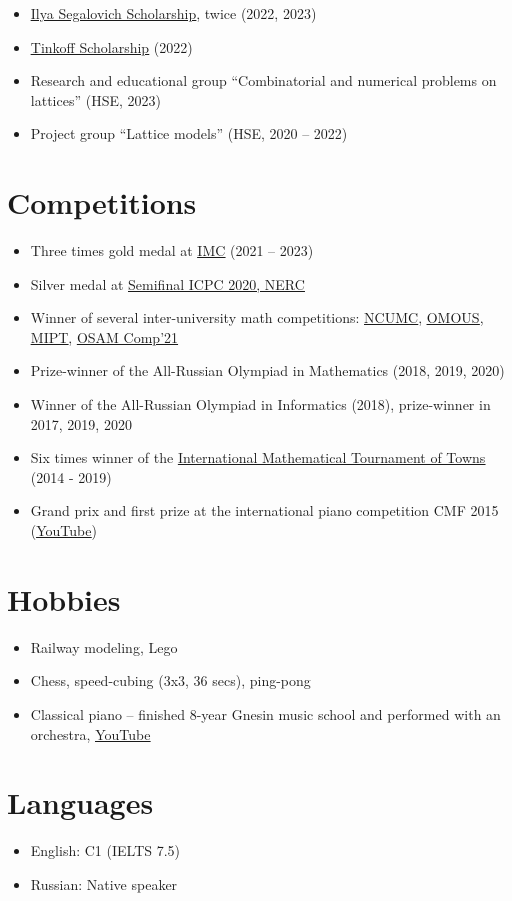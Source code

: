 \documentclass[letterpaper,11pt]{article}
\newcommand{\resumeBulletListStart}{\begin{itemize}[leftmargin=0.3in]}
\newcommand{\resumeBulletListEnd}{\end{itemize}\vspace{-8pt}}
\newcommand{\resumeItem}[1]{\item\small{{#1 \vspace{-2pt}}}}
\newcommand{\resumeSubItem}[1]{\resumeItem{#1}\vspace{-4pt}}
\begin{document}
\resumeBulletListStart
\resumeSubItem{\href{https://cs.hse.ru/en/stipend}{\underline{Ilya Segalovich Scholarship}}, twice (2022, 2023)}
\resumeSubItem{\href{https://www.tinkoff.ru/about/news/06042022-tinkoff-launches-scholarship-programme-for-russias-young-talent-eng/}{\underline{Tinkoff Scholarship}} (2022)}
\resumeSubItem{Research and educational group ``Combinatorial and numerical problems on lattices'' (HSE, 2023)}
\resumeSubItem{Project group ``Lattice models'' (HSE, 2020 -- 2022)}
\resumeBulletListEnd


\section{Competitions}

\resumeBulletListStart
\resumeSubItem{Three times gold medal at \href{https://imc-math.org.uk}{\underline{IMC}} (2021 -- 2023)}
\resumeSubItem{Silver medal at \href{https://neerc.ifmo.ru/archive/2020.html}{\underline{Semifinal ICPC 2020, NERC}}}
\resumeSubItem{Winner of several inter-university math competitions: \href{https://iuhd.edu.tm/competition/44}{\underline{NCUMC}}, \href{https://iuhd.edu.tm/competition/45}{\underline{OMOUS}}, \href{http://www.rkarasev.ru/note/66}{\underline{MIPT}}, \href{https://cs.hse.ru/en/announcements/504365867.html}{\underline{OSAM Comp'21}}}
\resumeSubItem{Prize-winner of the All-Russian Olympiad in Mathematics (2018, 2019, 2020)}
\resumeSubItem{Winner of the All-Russian Olympiad in Informatics (2018), prize-winner in 2017, 2019, 2020}
\resumeSubItem{Six times winner of the \href{https://www.turgor.ru/en/}{\underline{International Mathematical Tournament of Towns}} (2014 - 2019)}
\resumeSubItem{Grand prix and first prize at the international piano competition CMF 2015 (\href{https://www.youtube.com/watch?v=mFGwCgjjaP8}{\underline{YouTube}})}
\resumeBulletListEnd


\section{Hobbies}

\resumeBulletListStart
\resumeSubItem{Railway modeling, Lego}
\resumeSubItem{Chess, speed-cubing (3x3, 36 secs), ping-pong}
\resumeSubItem{Classical piano -- finished 8-year Gnesin music school and performed with an orchestra, \href{https://www.youtube.com/watch?v=KPUQTMAy0bQ&list=PL3n6QsMnv3lZyL8XD4WcQh4mhJ-REqBKN}{\underline{YouTube}}}
\resumeBulletListEnd


\section{Languages}

\resumeBulletListStart
\resumeSubItem{English: C1 (IELTS 7.5)}
\resumeSubItem{Russian: Native speaker}
\resumeBulletListEnd
\end{document}
